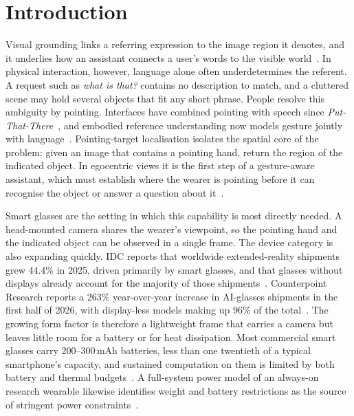 \section{Introduction}

Visual grounding links a referring expression to the image region it denotes, and it underlies how an assistant connects a user's words to the visible world~\cite{kazemzadeh2014referitgame,liu2024grounding,peng2023kosmos,you2024ferret}. In physical interaction, however, language alone often underdetermines the referent. A request such as \emph{what is that?} contains no description to match, and a cluttered scene may hold several objects that fit any short phrase. People resolve this ambiguity by pointing. Interfaces have combined pointing with speech since \emph{Put-That-There}~\cite{bolt1980put}, and embodied reference understanding now models gesture jointly with language~\cite{chen2021yourefit,li2023touchline}. Pointing-target localisation isolates the spatial core of the problem: given an image that contains a pointing hand, return the region of the indicated object. In egocentric views it is the first step of a gesture-aware assistant, which must establish where the wearer is pointing before it can recognise the object or answer a question about it~\cite{egopoint,choi2026hint,li2026egopointbench}.

Smart glasses are the setting in which this capability is most directly needed. A head-mounted camera shares the wearer's viewpoint, so the pointing hand and the indicated object can be observed in a single frame. The device category is also expanding quickly. IDC reports that worldwide extended-reality shipments grew 44.4\% in 2025, driven primarily by smart glasses, and that glasses without displays already account for the majority of those shipments~\cite{idc2026xr}. Counterpoint Research reports a 263\% year-over-year increase in AI-glasses shipments in the first half of 2026, with display-less models making up 96\% of the total~\cite{counterpoint2026aiglasses}. The growing form factor is therefore a lightweight frame that carries a camera but leaves little room for a battery or for heat dissipation. Most commercial smart glasses carry 200--300\,mAh batteries, less than one twentieth of a typical smartphone's capacity, and sustained computation on them is limited by both battery and thermal budgets~\cite{yuan2026aiglasses}. A full-system power model of an always-on research wearable likewise identifies weight and battery restrictions as the source of stringent power constraints~\cite{lee2025aria2}.

